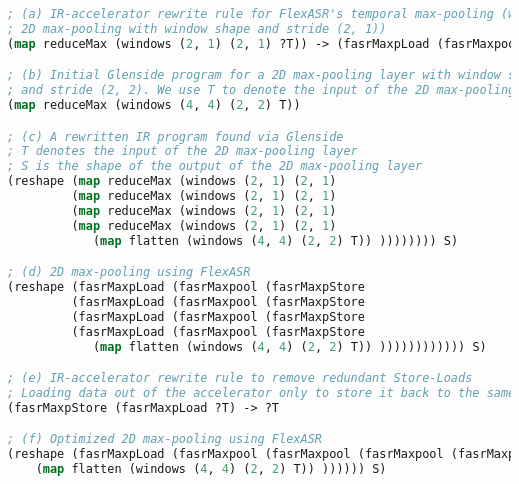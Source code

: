 
\begin{lstlisting}[language=lisp]
; (a) IR-accelerator rewrite rule for FlexASR's temporal max-pooling (which corresponds to 
; 2D max-pooling with window shape and stride (2, 1))
(map reduceMax (windows (2, 1) (2, 1) ?T)) -> (fasrMaxpLoad (fasrMaxpool (fasrMaxpStore ?T)))

; (b) Initial Glenside program for a 2D max-pooling layer with window shape (4, 4) 
; and stride (2, 2). We use T to denote the input of the 2D max-pooling layer.
(map reduceMax (windows (4, 4) (2, 2) T))

; (c) A rewritten IR program found via Glenside
; T denotes the input of the 2D max-pooling layer 
; S is the shape of the output of the 2D max-pooling layer
(reshape (map reduceMax (windows (2, 1) (2, 1) 
         (map reduceMax (windows (2, 1) (2, 1) 
         (map reduceMax (windows (2, 1) (2, 1) 
         (map reduceMax (windows (2, 1) (2, 1) 
            (map flatten (windows (4, 4) (2, 2) T)) )))))))) S)

; (d) 2D max-pooling using FlexASR
(reshape (fasrMaxpLoad (fasrMaxpool (fasrMaxpStore 
         (fasrMaxpLoad (fasrMaxpool (fasrMaxpStore 
         (fasrMaxpLoad (fasrMaxpool (fasrMaxpStore 
         (fasrMaxpLoad (fasrMaxpool (fasrMaxpStore 
            (map flatten (windows (4, 4) (2, 2) T)) )))))))))))) S)

; (e) IR-accelerator rewrite rule to remove redundant Store-Loads
; Loading data out of the accelerator only to store it back to the same location is unnecessary
(fasrMaxpStore (fasrMaxpLoad ?T) -> ?T

; (f) Optimized 2D max-pooling using FlexASR
(reshape (fasrMaxpLoad (fasrMaxpool (fasrMaxpool (fasrMaxpool (fasrMaxpool (fasrMaxpStore 
    (map flatten (windows (4, 4) (2, 2) T)) )))))) S)
\end{lstlisting}


